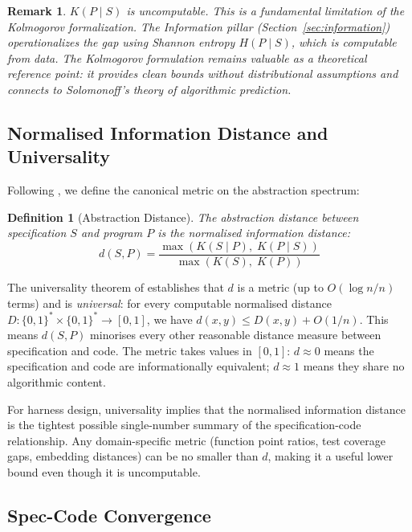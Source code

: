\documentclass[11pt, a4paper, logo, copyright]{googledeepmind}
\newtheorem{definition}{Definition}[section]
\newtheorem*{remark}{Remark}
\begin{document}
\begin{remark}
$K(P \mid S)$ is uncomputable. This is a fundamental limitation of the Kolmogorov formalization. The Information pillar (Section~\ref{sec:information}) operationalizes the gap using Shannon entropy $H(P \mid S)$, which is computable from data. The Kolmogorov formulation remains valuable as a theoretical reference point: it provides clean bounds without distributional assumptions and connects to Solomonoff's theory of algorithmic prediction.
\end{remark}

\subsection{Normalised Information Distance and Universality}

Following \citet{li2004similarity}, we define the canonical metric on the abstraction spectrum:

\begin{definition}[Abstraction Distance]
The \emph{abstraction distance} between specification $S$ and program $P$ is the normalised information distance:
\begin{equation}
    d(S, P) = \frac{\max(K(S \mid P),\; K(P \mid S))}{\max(K(S),\; K(P))}
\end{equation}
\end{definition}

The universality theorem of \citet{li2004similarity} establishes that $d$ is a metric (up to $O(\log n / n)$ terms) and is \emph{universal}: for every computable normalised distance $D: \{0,1\}^* \times \{0,1\}^* \to [0,1]$, we have $d(x, y) \leq D(x, y) + O(1/n)$. This means $d(S, P)$ minorises every other reasonable distance measure between specification and code. The metric takes values in $[0, 1]$: $d \approx 0$ means the specification and code are informationally equivalent; $d \approx 1$ means they share no algorithmic content.

For harness design, universality implies that the normalised information distance is the tightest possible single-number summary of the specification-code relationship. Any domain-specific metric (function point ratios, test coverage gaps, embedding distances) can be no smaller than $d$, making it a useful lower bound even though it is uncomputable.

\subsection{Spec-Code Convergence}
\end{document}
